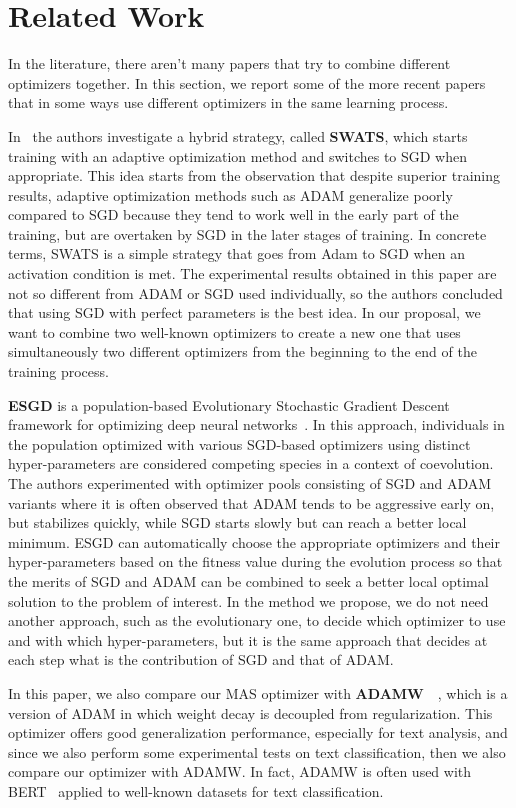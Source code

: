 \documentclass[10pt,twocolumn,letterpaper]{article}
\begin{document}
\section{Related Work}
In the literature, there aren't many papers that try to combine different optimizers together.
In this section, we report some of the more recent papers that in some ways use different optimizers in the same learning process.

In~\cite{keskar2017improving} the authors investigate a hybrid strategy, called \textbf{SWATS}, which starts training with an adaptive optimization method and switches to SGD when appropriate.
This idea starts from the observation that despite superior training results, adaptive optimization methods such as ADAM generalize poorly compared to SGD because they tend to work well in the early part of the training, but are overtaken by SGD in the later stages of training.
In concrete terms, SWATS is a simple strategy that goes from Adam to SGD when an activation condition is met.
The experimental results obtained in this paper are not so different from ADAM or SGD used individually, so the authors concluded that using SGD with perfect parameters is the best idea.
In our proposal, we want to combine two well-known optimizers to create a new one that uses simultaneously two different optimizers from the beginning to the end of the training process.


\textbf{ESGD} is a population-based Evolutionary Stochastic Gradient Descent framework for optimizing deep neural networks~\cite{cui2018evolutionary}.  
In this approach, individuals in the population optimized with various SGD-based optimizers using distinct hyper-parameters are considered competing species in a context of coevolution.
The authors experimented with optimizer pools consisting of SGD and ADAM variants where it is often observed that ADAM tends to be aggressive early on, but stabilizes quickly, while SGD starts slowly but can reach a better local minimum. ESGD can automatically choose the appropriate optimizers and their hyper-parameters based on the fitness value during the evolution process so that the merits of SGD and ADAM can be combined to seek a better local optimal solution to the problem of interest.
In the method we propose, we do not need another approach, such as the evolutionary one, to decide which optimizer to use and with which hyper-parameters, but it is the same approach that decides at each step what is the contribution of SGD and that of ADAM.

In this paper, we also compare our MAS optimizer with
\textbf{ADAMW}~\cite{loshchilov2017decoupled}~\cite{loshchilov2018fixing}, which is a version of ADAM in which weight decay is decoupled from  regularization.
This optimizer offers good generalization performance, especially for text analysis, and since we also perform some experimental tests on text classification, then we also compare our optimizer with ADAMW.
In fact, ADAMW is often used with BERT~\cite{devlin2018bert} applied to well-known datasets for text classification.
\end{document}
